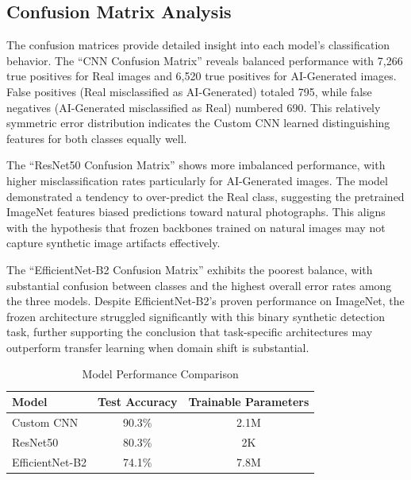 \documentclass[man,12pt,letterpaper,donotrepeattitle,floatsintext]{apa7}
\begin{document}
\subsection{Confusion Matrix Analysis}
The confusion matrices provide detailed insight into each model's classification behavior. 
The ``CNN Confusion Matrix'' reveals balanced performance with 7,266 true positives for Real 
images and 6,520 true positives for AI-Generated images. False positives (Real misclassified 
as AI-Generated) totaled 795, while false negatives (AI-Generated misclassified as Real) 
numbered 690. This relatively symmetric error distribution indicates the Custom CNN learned 
distinguishing features for both classes equally well.

The ``ResNet50 Confusion Matrix'' shows more imbalanced performance, with higher misclassification 
rates particularly for AI-Generated images. The model demonstrated a tendency to over-predict 
the Real class, suggesting the pretrained ImageNet features biased predictions toward natural 
photographs. This aligns with the hypothesis that frozen backbones trained on natural images 
may not capture synthetic image artifacts effectively.

The ``EfficientNet-B2 Confusion Matrix'' exhibits the poorest balance, with substantial 
confusion between classes and the highest overall error rates among the three models. Despite 
EfficientNet-B2's proven performance on ImageNet, the frozen architecture struggled significantly 
with this binary synthetic detection task, further supporting the conclusion that task-specific 
architectures may outperform transfer learning when domain shift is substantial.

\processdelayedfloats
\begin{table}[!htbp]
\centering
\captionsetup{justification=centering}
\begin{threeparttable}
\caption{Model Performance Comparison}
\label{tab:results}
\begin{tabular}{lcc}
\hline
\textbf{Model} & \textbf{Test Accuracy} & \textbf{Trainable Parameters} \\
\hline
Custom CNN & 90.3\% & 2.1M \\
ResNet50 & 80.3\% & 2K \\
EfficientNet-B2 & 74.1\% & 7.8M \\
\hline
\end{tabular}
\end{threeparttable}
\end{table}
\end{document}
